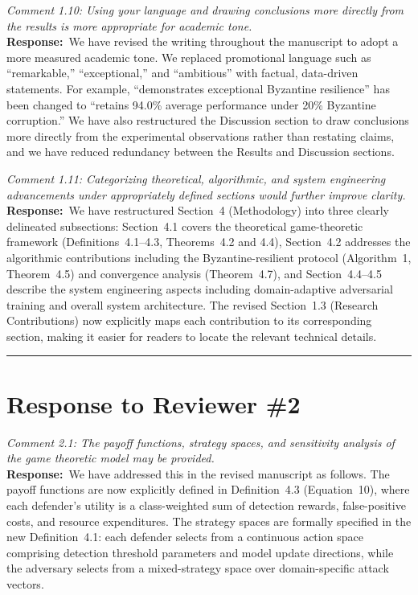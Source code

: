 \documentclass[12pt,a4paper]{article}
\newcommand{\RC}[1]{\noindent\textit{#1}\vspace{0.3em}\\}
\newcommand{\AR}{\noindent\textbf{Response:}~}
\begin{document}
\vspace{0.8em}

\RC{Comment 1.10: Using your language and drawing conclusions more directly from the results is more appropriate for academic tone.}

\AR We have revised the writing throughout the manuscript to adopt a more measured academic tone. We replaced promotional language such as ``remarkable,'' ``exceptional,'' and ``ambitious'' with factual, data-driven statements. For example, ``demonstrates exceptional Byzantine resilience'' has been changed to ``retains 94.0\% average performance under 20\% Byzantine corruption.'' We have also restructured the Discussion section to draw conclusions more directly from the experimental observations rather than restating claims, and we have reduced redundancy between the Results and Discussion sections.

\vspace{0.8em}

\RC{Comment 1.11: Categorizing theoretical, algorithmic, and system engineering advancements under appropriately defined sections would further improve clarity.}

\AR We have restructured Section~4 (Methodology) into three clearly delineated subsections: Section~4.1 covers the theoretical game-theoretic framework (Definitions~4.1--4.3, Theorems~4.2 and 4.4), Section~4.2 addresses the algorithmic contributions including the Byzantine-resilient protocol (Algorithm~1, Theorem~4.5) and convergence analysis (Theorem~4.7), and Section~4.4--4.5 describe the system engineering aspects including domain-adaptive adversarial training and overall system architecture. The revised Section~1.3 (Research Contributions) now explicitly maps each contribution to its corresponding section, making it easier for readers to locate the relevant technical details.

\vspace{1.5em}
\hrule
\vspace{1em}

\section*{Response to Reviewer \#2}

\RC{Comment 2.1: The payoff functions, strategy spaces, and sensitivity analysis of the game theoretic model may be provided.}

\AR We have addressed this in the revised manuscript as follows. The payoff functions are now explicitly defined in Definition~4.3 (Equation~10), where each defender's utility is a class-weighted sum of detection rewards, false-positive costs, and resource expenditures. The strategy spaces are formally specified in the new Definition~4.1: each defender selects from a continuous action space comprising detection threshold parameters and model update directions, while the adversary selects from a mixed-strategy space over domain-specific attack vectors.
\end{document}
